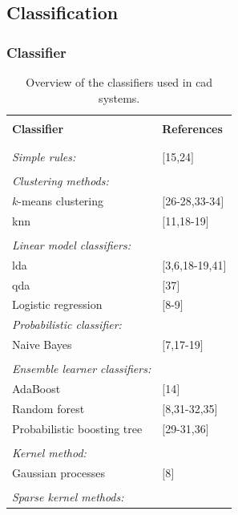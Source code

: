 \subsection{Classification} \label{subsec:classification}

\subsubsection{Classifier}

\begin{table}
	\caption{Overview of the classifiers used in \ac{cad} systems.}
	\small
	\begin{tabular}{p{.60\linewidth} p{.30\linewidth}}
		\hline \\ [-1.5ex]
		\textbf{Classifier} & \textbf{References} \\ \\ [-1.5ex]
		\hline \\ [-1.5ex]
		\textit{Simple rules:} & $[$15,24$]$ \\ \\ [-1.5ex]
		\textit{Clustering methods:} & \\
		\quad $k$-means clustering & $[$26-28,33-34$]$ \\
		\quad \acs{knn} & $[$11,18-19$]$ \\ \\ [-1.5ex]
		\textit{Linear model classifiers:} & \\
		\quad \acs{lda} & $[$3,6,18-19,41$]$ \\
		\quad \acs{qda} & $[$37$]$ \\
		\quad Logistic regression & $[$8-9$]$ \\
		\textit{Probabilistic classifier:} & \\
		\quad Naive Bayes & $[$7,17-19$]$ \\ \\ [-1.5ex]
		\textit{Ensemble learner classifiers:} & \\
		\quad AdaBoost & $[$14$]$ \\
		\quad Random forest & $[$8,31-32,35$]$ \\
		\quad Probabilistic boosting tree & $[$29-31,36$]$ \\ \\ [-1.5ex]
		\textit{Kernel method:} & \\
		\quad Gaussian processes & $[$8$]$ \\ \\ [-1.5ex]
		\textit{Sparse kernel methods:} & \\

\end{tabular}
\end{table}
